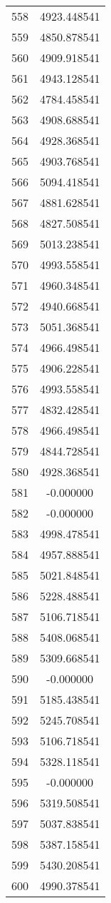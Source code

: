 \documentclass[12pt]{article}
\begin{document}
\begin{longtable}{@{}cc@{}}
558 & 4923.448541 \\
559 & 4850.878541 \\
560 & 4909.918541 \\
561 & 4943.128541 \\
562 & 4784.458541 \\
563 & 4908.688541 \\
564 & 4928.368541 \\
565 & 4903.768541 \\
566 & 5094.418541 \\
567 & 4881.628541 \\
568 & 4827.508541 \\
569 & 5013.238541 \\
570 & 4993.558541 \\
571 & 4960.348541 \\
572 & 4940.668541 \\
573 & 5051.368541 \\
574 & 4966.498541 \\
575 & 4906.228541 \\
576 & 4993.558541 \\
577 & 4832.428541 \\
578 & 4966.498541 \\
579 & 4844.728541 \\
580 & 4928.368541 \\
581 & -0.000000 \\
582 & -0.000000 \\
583 & 4998.478541 \\
584 & 4957.888541 \\
585 & 5021.848541 \\
586 & 5228.488541 \\
587 & 5106.718541 \\
588 & 5408.068541 \\
589 & 5309.668541 \\
590 & -0.000000 \\
591 & 5185.438541 \\
592 & 5245.708541 \\
593 & 5106.718541 \\
594 & 5328.118541 \\
595 & -0.000000 \\
596 & 5319.508541 \\
597 & 5037.838541 \\
598 & 5387.158541 \\
599 & 5430.208541 \\
600 & 4990.378541 \\

\end{longtable}
\end{document}
